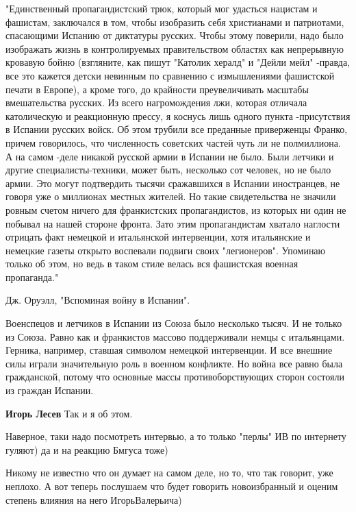 \begin{itemize}
"Единственный пропагандистский трюк, который мог удасться нацистам и фашистам,
заключался в том, чтобы изобразить себя христианами и патриотами, спасающими
Испанию от диктатуры русских. Чтобы этому поверили, надо было изображать жизнь
в контролируемых правительством областях как непрерывную кровавую бойню
(взгляните, как пишут "Католик хералд" и "Дейли мейл" -правда, все это кажется
детски невинным по сравнению с измышлениями фашистской печати в Европе), а
кроме того, до крайности преувеличивать масштабы вмешательства русских. Из
всего нагромождения лжи, которая отличала католическую и реакционную прессу, я
коснусь лишь одного пункта -присутствия в Испании русских войск. Об этом
трубили все преданные приверженцы Франко, причем говорилось, что численность
советских частей чуть ли не полмиллиона. А на самом -деле никакой русской армии
в Испании не было. Были летчики и другие специалисты-техники, может быть,
несколько сот человек, но не было армии. Это могут подтвердить тысячи
сражавшихся в Испании иностранцев, не говоря уже о миллионах местных жителей.
Но такие свидетельства не значили ровным счетом ничего для франкистских
пропагандистов, из которых ни один не побывал на нашей стороне фронта. Зато
этим пропагандистам хватало наглости отрицать факт немецкой и итальянской
интервенции, хотя итальянские и немецкие газеты открыто воспевали подвиги своих
"легионеров". Упоминаю только об этом, но ведь в таком стиле велась вся
фашистская военная пропаганда."

Дж. Оруэлл, "Вспоминая войну в Испании".

\begin{itemize} %

Военспецов и летчиков в Испании из Союза было несколько тысяч. И не только из
Союза. Равно как и франкистов массово поддерживали немцы с итальянцами.
Герника, например, ставшая символом немецкой интервенции. И все внешние силы
играли значительную роль в военном конфликте. Но война все равно была
гражданской, потому что основные массы противоборствующих сторон состояли из
граждан Испании.


\textbf{Игорь Лесев} Так и я об этом.

\end{itemize} %


Наверное, таки надо посмотреть интервью, а то только "перлы" ИВ по интернету
гуляют) да и на реакцию Бмгуса тоже)

Никому не известно что он думает на самом деле, но то, что так говорит, уже
неплохо. А вот теперь послушаем что будет говорить новоизбранный и оценим
степень влияния на него ИгорьВалерьича)


\end{itemize}

